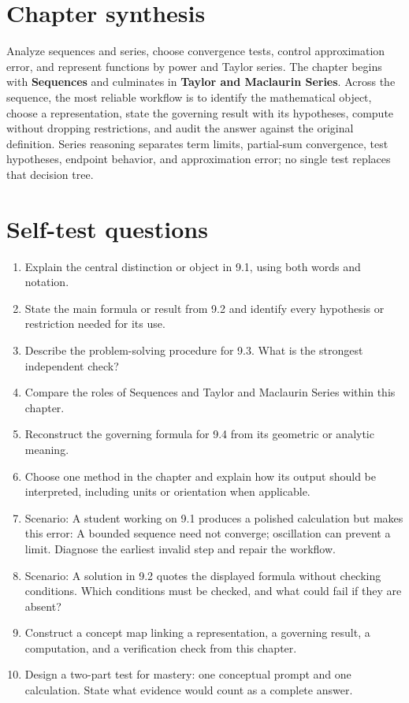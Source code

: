 \documentclass[11pt]{article}
\begin{document}
\section{Chapter synthesis}
Analyze sequences and series, choose convergence tests, control approximation error, and represent functions by power and Taylor series. The chapter begins with \textbf{Sequences} and culminates in \textbf{Taylor and Maclaurin Series}. Across the sequence, the most reliable workflow is to identify the mathematical object, choose a representation, state the governing result with its hypotheses, compute without dropping restrictions, and audit the answer against the original definition. Series reasoning separates term limits, partial-sum convergence, test hypotheses, endpoint behavior, and approximation error; no single test replaces that decision tree.

\section{Self-test questions}
\begin{enumerate}
\item Explain the central distinction or object in 9.1, using both words and notation.
\item State the main formula or result from 9.2 and identify every hypothesis or restriction needed for its use.
\item Describe the problem-solving procedure for 9.3. What is the strongest independent check?
\item Compare the roles of Sequences and Taylor and Maclaurin Series within this chapter.
\item Reconstruct the governing formula for 9.4 from its geometric or analytic meaning.
\item Choose one method in the chapter and explain how its output should be interpreted, including units or orientation when applicable.
\item Scenario: A student working on 9.1 produces a polished calculation but makes this error: A bounded sequence need not converge; oscillation can prevent a limit. Diagnose the earliest invalid step and repair the workflow.
\item Scenario: A solution in 9.2 quotes the displayed formula without checking conditions. Which conditions must be checked, and what could fail if they are absent?
\item Construct a concept map linking a representation, a governing result, a computation, and a verification check from this chapter.
\item Design a two-part test for mastery: one conceptual prompt and one calculation. State what evidence would count as a complete answer.
\end{enumerate}
\end{document}
